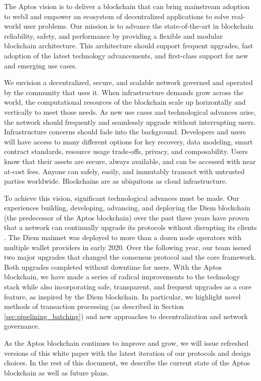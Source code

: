 \documentclass{article}
\begin{document}
The Aptos vision is to deliver a blockchain that can bring mainstream adoption to web3 and empower an ecosystem of decentralized applications to solve real-world user problems. Our mission is to advance the state-of-the-art in blockchain reliability, safety, and performance by providing a flexible and modular blockchain architecture. This architecture should support frequent upgrades, fast adoption of the latest technology advancements, and first-class support for new and emerging use cases.

We envision a decentralized, secure, and scalable network governed and operated by the community that uses it. When infrastructure demands grow across the world, the computational resources of the blockchain scale up horizontally and vertically to meet those needs. As new use cases and technological advances arise, the network should frequently and seamlessly upgrade without interrupting users. Infrastructure concerns should fade into the background. Developers and users will have access to many different options for key recovery, data modeling, smart contract standards, resource usage trade-offs, privacy, and composability. Users know that their assets are secure, always available, and can be accessed with near at-cost fees.  Anyone can safely, easily, and immutably transact with untrusted parties worldwide. Blockchains are as ubiquitous as cloud infrastructure.

To achieve this vision, significant technological advances must be made. Our experiences building, developing, advancing, and deploying the Diem blockchain (the predecessor of the Aptos blockchain) over the past three years have proven that a network can continually upgrade its protocols without disrupting its clients \cite{diem_blockchain}. The Diem mainnet was deployed to more than a dozen node operators with multiple wallet providers in early 2020. Over the following year, our team issued two major upgrades that changed the consensus protocol and the core framework. Both upgrades completed without downtime for users. With the Aptos blockchain, we have made a series of radical improvements to the technology stack while also incorporating safe, transparent, and frequent upgrades as a core feature, as inspired by the Diem blockchain. In particular, we highlight novel methods of transaction processing (as described in Section \ref{sec:pipelining_batching}) and new approaches to decentralization and network governance.

As the Aptos blockchain continues to improve and grow, we will issue refreshed versions of this white paper with the latest iteration of our protocols and design choices. In the rest of this document, we describe the current state of the Aptos blockchain as well as future plans.
\end{document}
